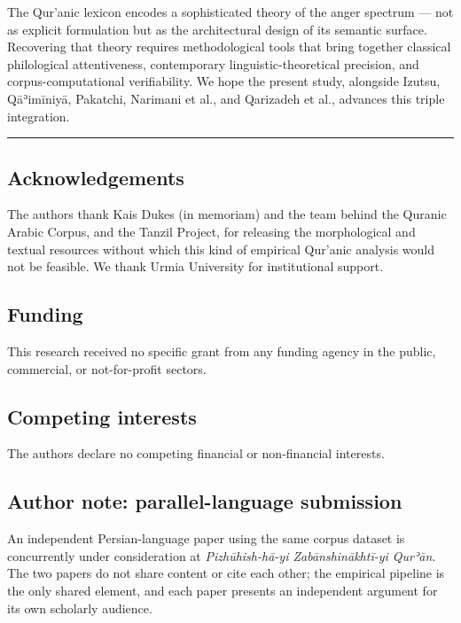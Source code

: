 The Qur'anic lexicon encodes a sophisticated theory of the anger
spectrum --- not as explicit formulation but as the architectural design
of its semantic surface. Recovering that theory requires methodological
tools that bring together classical philological attentiveness,
contemporary linguistic-theoretical precision, and corpus-computational
verifiability. We hope the present study, alongside Izutsu, Qāʾimīniyā,
Pakatchi, Narimani et al., and Qarizadeh et al., advances this triple
integration.

\begin{center}\rule{0.5\linewidth}{0.5pt}\end{center}

\subsection{Acknowledgements}\label{acknowledgements}

The authors thank Kais Dukes (in memoriam) and the team behind the
Quranic Arabic Corpus, and the Tanzil Project, for releasing the
morphological and textual resources without which this kind of empirical
Qur'anic analysis would not be feasible. We thank Urmia University for
institutional support.

\subsection{Funding}\label{funding}

This research received no specific grant from any funding agency in the
public, commercial, or not-for-profit sectors.

\subsection{Competing interests}\label{competing-interests}

The authors declare no competing financial or non-financial interests.

\subsection{Author note: parallel-language
submission}\label{author-note-parallel-language-submission}

An independent Persian-language paper using the same corpus dataset is
concurrently under consideration at \emph{Pizhūhish-hā-yi
Zabānshinākhtī-yi Qurʾān}. The two papers do not share content or cite
each other; the empirical pipeline is the only shared element, and each
paper presents an independent argument for its own scholarly audience.

